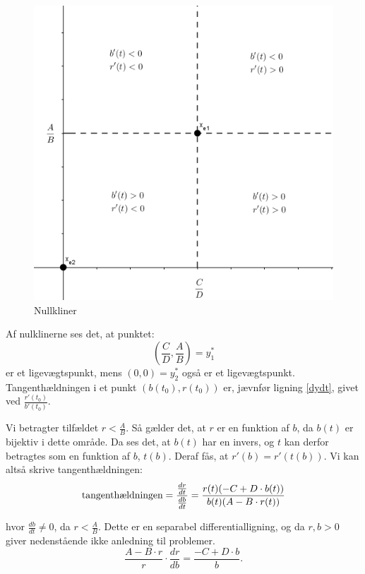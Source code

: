 \begin{figure} [H]
    \centering
    \includegraphics[scale=0.5]{Images/lvnull.png}
    \caption{Nullkliner \citep[s. 24]{Svensk}}
    \label{null}
\end{figure}

Af nulklinerne ses det, at punktet:
$$\left(\frac{C}{D}, \frac{A}{B}\right)=y^*_1$$
er et ligevægtspunkt, mens $(0,0)=y^*_2$ også er et ligevægtspunkt.\\ \hfill \break
Tangenthældningen i et punkt $(b(t_0), r(t_0))$ er, jævnfør ligning \eqref{dydt}, givet ved $\frac{r'(t_0)}{b'(t_0)}$.


Vi betragter tilfældet $r<\frac{A}{B}$. Så gælder det, at $r$ er en funktion af $b$, da $b(t)$ er bijektiv i dette område. Da ses det, at $b(t)$ har en invers, og $t$ kan derfor betragtes som en funktion af $b$, $t(b)$. Deraf fås, at $r'(b) = r'(t(b))$. Vi kan altså skrive tangenthældningen:
$$\textnormal{tangenthældningen}=\frac{\frac{dr}{dt}}{\frac{db}{dt}}=\frac{r(t)(-C+D\cdot b(t))}{b(t)(A-B\cdot r(t))}$$

hvor $\frac{db}{dt}\neq 0$, da $r<\frac{A}{B}$. Dette er en separabel differentialligning, og da $r,b > 0$ giver nedenstående ikke anledning til problemer.
\begin{equation}
    \frac{A-B\cdot r}{r}\cdot \frac{dr}{db}= \frac{-C+D\cdot b}{b}.
\label{r(t)ogb(t)}
\end{equation}


